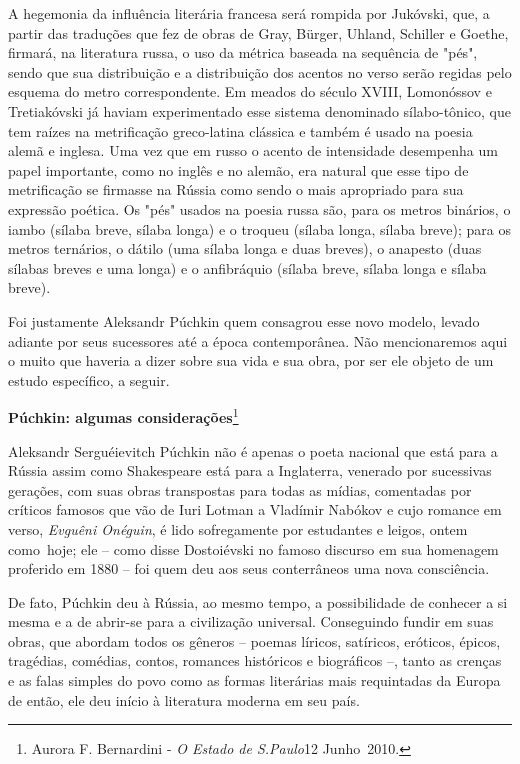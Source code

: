 A hegemonia da influência literária francesa será rompida por Jukóvski,
que, a partir das traduções que fez de obras de Gray, Bürger, Uhland,
Schiller e Goethe, firmará, na literatura russa, o uso da métrica
baseada na sequência de "pés", sendo que sua distribuição e a
distribuição dos acentos no verso serão regidas pelo esquema do metro
correspondente. Em meados do século XVIII, Lomonóssov e Tretiakóvski já
haviam experimentado esse sistema denominado sílabo-tônico, que tem
raízes na metrificação greco-latina clássica e também é usado na poesia
alemã e inglesa. Uma vez que em russo o acento de intensidade desempenha
um papel importante, como no inglês e no alemão, era natural que esse
tipo de metrificação se firmasse na Rússia como sendo o mais apropriado
para sua expressão poética. Os "pés" usados na poesia russa são, para os
metros binários, o iambo (sílaba breve, sílaba longa) e o troqueu
(sílaba longa, sílaba breve); para os metros ternários, o dátilo (uma
sílaba longa e duas breves), o anapesto (duas sílabas breves e uma
longa) e o anfibráquio (sílaba breve, sílaba longa e sílaba breve).

Foi justamente Aleksandr Púchkin quem consagrou esse novo modelo, levado
adiante por seus sucessores até a época contemporânea. Não mencionaremos
aqui o muito que haveria a dizer sobre sua vida e sua obra, por ser ele
objeto de um estudo específico, a seguir.

\protect\hypertarget{_Hlk489985786}{}{}\textbf{Púchkin: algumas
considerações}\footnote{Aurora F. Bernardini - \emph{O Estado de
  S.Paulo}12 Junho~2010.}

Aleksandr Serguéievitch Púchkin não é apenas o poeta nacional que está
para a Rússia assim como Shakespeare está para a Inglaterra, venerado
por sucessivas gerações, com suas obras transpostas para todas as
mídias, comentadas por críticos famosos que vão de Iuri Lotman a
Vladímir Nabókov e cujo romance em verso, \emph{Evguêni Onéguin}, é lido
sofregamente por estudantes e leigos, ontem como~hoje; ele -- como disse
Dostoiévski no famoso discurso em sua homenagem proferido em 1880 -- foi
quem deu aos seus conterrâneos uma nova consciência.

De fato, Púchkin deu à Rússia, ao mesmo tempo, a possibilidade de
conhecer a si mesma e a de abrir-se para a civilização universal.
Conseguindo fundir em suas obras, que abordam todos os gêneros -- poemas
líricos, satíricos, eróticos, épicos, tragédias, comédias, contos,
romances históricos e biográficos --, tanto as crenças e as falas
simples do povo como as formas literárias mais requintadas da Europa de
então, ele deu início à literatura moderna em seu país.

